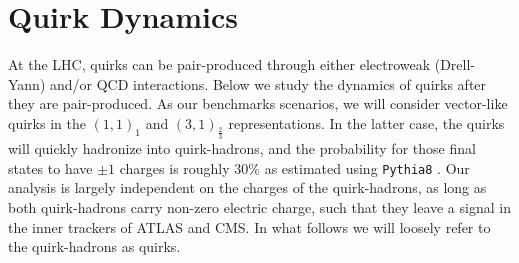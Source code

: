 \documentclass[10pt,aps,prd,nofootinbib,superscriptaddress,twocolumn,preprintnumbers,balancelastpage]{revtex4}
\begin{document}
\section{Quirk Dynamics}
\label{sec:dynamics}
At the LHC, quirks can be pair-produced through either electroweak (Drell-Yann) and/or QCD interactions. Below we study the dynamics of quirks after they are pair-produced. As our benchmarks scenarios, we will consider vector-like quirks in the $(1,1)_1$ and $(3,1)_{\frac{2}{3}}$ representations. In the latter case, the quirks will quickly hadronize into quirk-hadrons, and the probability for those final states to have $\pm 1$ charges is roughly 30\% as estimated using \texttt{Pythia8} \cite{Sjostrand:2014zea}. Our analysis is largely independent on the charges of the quirk-hadrons, as long as both quirk-hadrons carry non-zero electric charge, such that they leave a signal in the inner trackers of ATLAS and CMS. In what follows we will loosely refer to the quirk-hadrons as quirks.  

 
\end{document}
